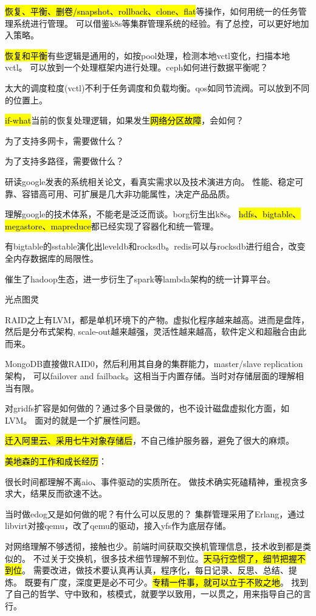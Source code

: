 \hl{恢复、平衡、删卷/snapshot、rollback、clone、flat}等操作，如何用统一的任务管理系统进行管理。
可以借鉴k8s等集群管理系统的经验。有了总控，可以更好地加入策略。

\hl{恢复和平衡}有些逻辑是通用的，如按pool处理，检测本地vctl变化，扫描本地vctl。
可以放到一个处理框架内进行处理。ceph如何进行数据平衡呢？

太大的调度粒度(vctl)不利于任务调度和负载均衡。qos如同节流阀。可以放到不同的位置上。

\hl{if-what}当前的恢复处理逻辑，如果发生\hl{网络分区故障}，会如何？

为了支持多网卡，需要做什么？

为了支持多路径，需要做什么？

\hrulefill

研读google发表的系统相关论文，看真实需求以及技术演进方向。
性能、稳定可靠、容错高可用、可扩展是几大非功能属性，决定产品品质。

理解google的技术体系，不能老是泛泛而谈。borg衍生出k8s。
\hl{hdfs、bigtable、megastore、mapreduce}都已经实现了容器化和统一管理。

有bigtable的sstable演化出leveldb和rocksdb。redis可以与rocksdb进行组合，改变全内存数据库的局限性。

催生了hadoop生态，进一步衍生了spark等lambda架构的统一计算平台。

\hrulefill

光点图灵

RAID之上有LVM，都是单机环境下的产物。虚拟化程序越来越高。进而是盘阵，然后是分布式架构,
scale-out越来越强，灵活性越来越高，软件定义和超融合由此而来。

MongoDB直接做RAID0，然后利用其自身的集群能力，master/slave replication架构，
可以failover and failback。这相当于内置存储。当时对存储层面的理解相当有限。

对gridfs扩容是如何做的？通过多个目录做的，也不设计磁盘虚拟化方面，如LVM。
面对的就是一个扩展性问题。

\hl{迁入阿里云、采用七牛对象存储后}，不自己维护服务器，避免了很大的麻烦。

\hrulefill

\hl{美地森的工作和成长经历}：

很长时间都理解不离aio、事件驱动的实质所在。
做技术确实死磕精神，重视贪多求大，结果反而欲速不达。

当时做edog又是如何做的呢？有什么可以反思的？
集群管理采用了Erlang，通过libvirt对接qemu，改了qemu的驱动，接入yfs作为底层存储。

对网络理解不够透彻，接触也少。前端时间获取交换机管理信息，技术收到都是类似的。
不过关于交换机，很多技术细节理解不到位。\hl{天马行空惯了，细节把握不到位}。
需要改进，做技术要认真再认真，程序化，每日记录、反思、总结、提炼。
既要有广度，深度更是必不可少。\hl{专精一件事，就可以立于不败之地}。
找到了自己的哲学、守中致和，核模式，就要学以致用，一以贯之，用来指导自己的言行。

